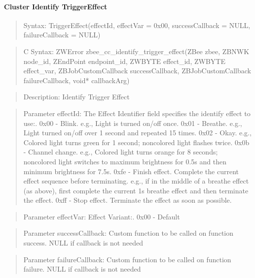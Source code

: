 \paragraph{Cluster Identify TriggerEffect}
\begin{quote}Syntax: TriggerEffect(effectId, effectVar = 0x00, successCallback = NULL, failureCallback = NULL)\end{quote}
\begin{quote}C Syntax: ZWError zbee\_cc\_identify\_trigger\_effect(ZBee zbee, ZBNWK node\_id, ZEndPoint endpoint\_id, ZWBYTE effect\_id, ZWBYTE effect\_var, ZBJobCustomCallback successCallback, ZBJobCustomCallback failureCallback, void* callbackArg)\end{quote}
\begin{quote}Description: Identify Trigger Effect\end{quote}
\begin{quote}Parameter effectId: The Effect Identifier field specifies the identify effect to use:. 0x00 - Blink. e.g., Light is turned on/off once. 0x01 - Breathe. e.g., Light turned on/off over 1 second and repeated 15 times. 0x02 - Okay. e.g., Colored light turns green for 1 second; noncolored light flashes twice. 0x0b - Channel change. e.g., Colored light turns orange for 8 seconds; noncolored light switches to maximum brightness for 0.5s and then minimum brightness for 7.5s. 0xfe - Finish effect. Complete the current effect sequence before terminating. e.g., if in the middle of a breathe effect (as above), first complete the current 1s breathe effect and then terminate the effect. 0xff - Stop effect. Terminate the effect as soon as possible. \end{quote}
\begin{quote}Parameter effectVar: Effect Variant:. 0x00 - Default\end{quote}
\begin{quote}Parameter successCallback: Custom function to be called on function success. NULL if callback is not needed\end{quote}
\begin{quote}Parameter failureCallback: Custom function to be called on function failure. NULL if callback is not needed\end{quote}


